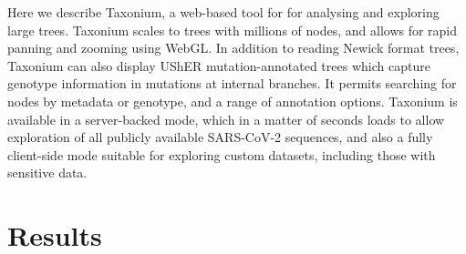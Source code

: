 \documentclass[twocolumn]{bioRxiv}
\begin{document}
Here we describe Taxonium, a web-based tool for for analysing and exploring large trees. Taxonium scales to trees with millions of nodes, and allows for rapid panning and zooming using WebGL. In addition to reading Newick format trees, Taxonium can also display UShER mutation-annotated trees which capture genotype information in mutations at internal branches. It permits searching for nodes by metadata or genotype, and a range of annotation options. Taxonium is available in a server-backed mode, which in a matter of seconds loads to allow exploration of all publicly available SARS-CoV-2 sequences, and also a fully client-side mode suitable for exploring custom datasets, including those with sensitive data.


\section*{Results}\label{s:results}
\end{document}
